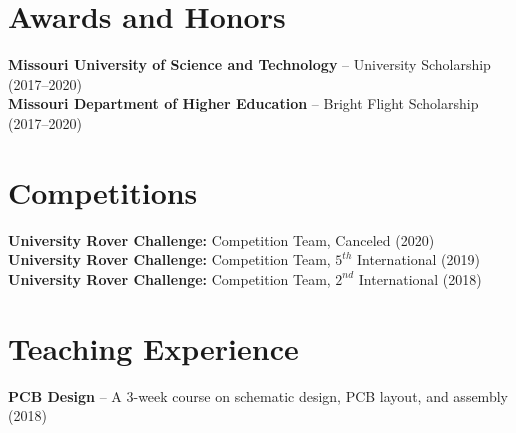 \documentclass[letterpaper,11pt]{article}
\begin{document}
\section{Awards and Honors}
\begin{itemize}[leftmargin=0.15in, label={}]
	\small{\item{\textbf{Missouri University of Science and Technology} -- University Scholarship (2017--2020)\\
	\textbf{Missouri Department of Higher Education} -- Bright Flight Scholarship (2017--2020)
}}
\end{itemize}

\section{Competitions}
\begin{itemize}[leftmargin=0.15in, label={}]
	\small{\item{\textbf{University Rover Challenge:} Competition Team, Canceled (2020)\\
				 \textbf{University Rover Challenge:} Competition Team, $5^{th}$ International (2019)\\
				 \textbf{University Rover Challenge:} Competition Team, $2^{nd}$ International (2018)\\
	}}
\end{itemize}

\section{Teaching Experience}
\begin{itemize}[leftmargin=0.15in, label={}]
	\small{\item{\textbf{PCB Design} -- A 3-week course on schematic design, PCB layout, and assembly (2018)
	}}
\end{itemize}

\thispagestyle{myheadings}

\end{document}
